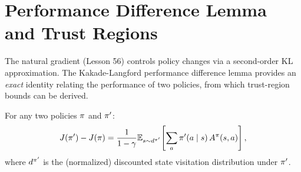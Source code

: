 \documentclass[11pt,a4paper]{article}
\begin{document}
\section{Performance Difference Lemma and Trust Regions}
\label{sec:trust-regions}

The natural gradient (Lesson 56) controls policy changes via a
second-order KL approximation. The Kakade-Langford performance
difference lemma provides an \emph{exact} identity relating the
performance of two policies, from which trust-region bounds can be
derived.

\begin{theorem}
\label{thm:pdl}
For any two policies $\pi$ and $\pi'$:
\[
  J(\pi') - J(\pi) = \frac{1}{1-\gamma}
  \mathbb{E}_{s \sim d^{\pi'}}\!\left[\sum_a \pi'(a \mid s)\,
  A^\pi(s,a)\right],
\]
where $d^{\pi'}$ is the (normalized) discounted state visitation
distribution under $\pi'$.
\end{theorem}
\end{document}
